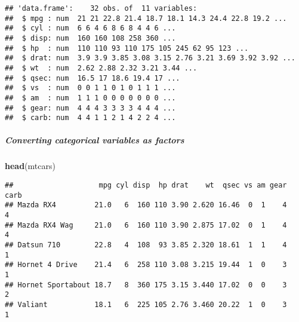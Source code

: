 \documentclass[
]{article}
\newenvironment{Shaded}{\begin{snugshade}}{\end{snugshade}}
\newcommand{\AttributeTok}[1]{\textcolor[rgb]{0.13,0.29,0.53}{#1}}
\newcommand{\CommentTok}[1]{\textcolor[rgb]{0.56,0.35,0.01}{\textit{#1}}}
\newcommand{\FunctionTok}[1]{\textcolor[rgb]{0.13,0.29,0.53}{\textbf{#1}}}
\newcommand{\NormalTok}[1]{#1}
\newcommand{\OtherTok}[1]{\textcolor[rgb]{0.56,0.35,0.01}{#1}}
\newcommand{\SpecialCharTok}[1]{\textcolor[rgb]{0.81,0.36,0.00}{\textbf{#1}}}
\newcommand{\StringTok}[1]{\textcolor[rgb]{0.31,0.60,0.02}{#1}}
\begin{document}
\begin{verbatim}
## 'data.frame':    32 obs. of  11 variables:
##  $ mpg : num  21 21 22.8 21.4 18.7 18.1 14.3 24.4 22.8 19.2 ...
##  $ cyl : num  6 6 4 6 8 6 8 4 4 6 ...
##  $ disp: num  160 160 108 258 360 ...
##  $ hp  : num  110 110 93 110 175 105 245 62 95 123 ...
##  $ drat: num  3.9 3.9 3.85 3.08 3.15 2.76 3.21 3.69 3.92 3.92 ...
##  $ wt  : num  2.62 2.88 2.32 3.21 3.44 ...
##  $ qsec: num  16.5 17 18.6 19.4 17 ...
##  $ vs  : num  0 0 1 1 0 1 0 1 1 1 ...
##  $ am  : num  1 1 1 0 0 0 0 0 0 0 ...
##  $ gear: num  4 4 4 3 3 3 3 4 4 4 ...
##  $ carb: num  4 4 1 1 2 1 4 2 2 4 ...
\end{verbatim}

\hypertarget{converting-categorical-variables-as-factors}{%
\subparagraph{Converting categorical variables as
factors}\label{converting-categorical-variables-as-factors}}

\begin{Shaded}
\end{Shaded}

\begin{Shaded}
\begin{Highlighting}[]
\FunctionTok{head}\NormalTok{(mtcars)}
\end{Highlighting}
\end{Shaded}

\begin{verbatim}
##                    mpg cyl disp  hp drat    wt  qsec vs am gear carb
## Mazda RX4         21.0   6  160 110 3.90 2.620 16.46  0  1    4    4
## Mazda RX4 Wag     21.0   6  160 110 3.90 2.875 17.02  0  1    4    4
## Datsun 710        22.8   4  108  93 3.85 2.320 18.61  1  1    4    1
## Hornet 4 Drive    21.4   6  258 110 3.08 3.215 19.44  1  0    3    1
## Hornet Sportabout 18.7   8  360 175 3.15 3.440 17.02  0  0    3    2
## Valiant           18.1   6  225 105 2.76 3.460 20.22  1  0    3    1
\end{verbatim}
\end{document}
